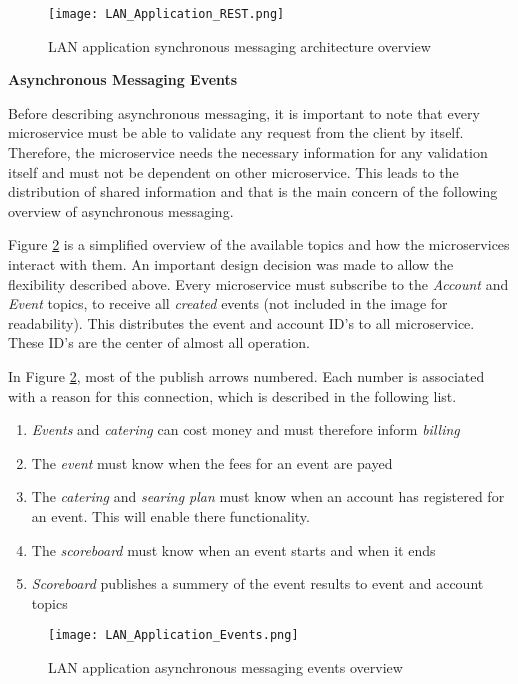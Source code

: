 \begin{figure}
	\centering
	\texttt{[image: LAN\_Application\_REST.png]}
	\caption{LAN application synchronous messaging architecture overview}
	\label{img:lansyncoverview}
\end{figure}

\textbf{Asynchronous Messaging Events}

Before describing asynchronous messaging, it is important to note that every microservice must be able to validate any request from the client by itself.
Therefore, the microservice needs the necessary information for any validation itself and must not be dependent on other microservice.
This leads to the distribution of shared information and that is the main concern of the following overview of asynchronous messaging.

Figure \ref{img:lanasyncevents} is a simplified overview of the available topics and how the microservices interact with them.
An important design decision was made to allow the flexibility described above.
Every microservice must subscribe to the \textit{Account} and \textit{Event} topics, to receive all \textit{created} events (not included in the image for readability).
This distributes the event and account ID's to all microservice.
These ID's are the center of almost all operation.

In Figure \ref{img:lanasyncevents}, most of the publish arrows numbered.
Each number is associated with a reason for this connection, which is described in the following list.
\begin{enumerate}
	\item \textit{Events} and \textit{catering} can cost money and must therefore inform \textit{billing}
	\item The \textit{event} must know when the fees for an event are payed
	\item The \textit{catering} and \textit{searing plan} must know when an account has registered for an event. This will enable there functionality.
	\item The \textit{scoreboard} must know when an event starts and when it ends
	\item \textit{Scoreboard} publishes a summery of the event results to event and account topics
\end{enumerate}

\begin{figure}
	\centering
	\texttt{[image: LAN\_Application\_Events.png]}
	\caption{LAN application asynchronous messaging events overview}
	\label{img:lanasyncevents}
\end{figure}

